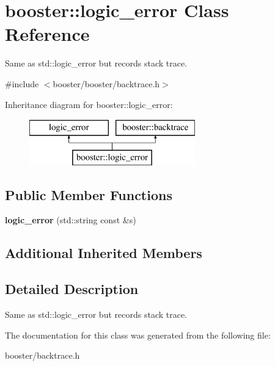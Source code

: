 \section{booster\-:\-:logic\-\_\-error Class Reference}
\label{classbooster_1_1logic__error}


Same as std\-::logic\-\_\-error but records stack trace.  




{\ttfamily \#include $<$booster/booster/backtrace.\-h$>$}

Inheritance diagram for booster\-:\-:logic\-\_\-error\-:\begin{figure}[H]
\begin{center}
\leavevmode
\includegraphics[height=2.000000cm]{classbooster_1_1logic__error}
\end{center}
\end{figure}
\subsection*{Public Member Functions}
\begin{DoxyCompactItemize}
\item 
{\bfseries logic\-\_\-error} (std\-::string const \&s)\label{classbooster_1_1logic__error_a278715b977332a5dfd2130167761518f}

\end{DoxyCompactItemize}
\subsection*{Additional Inherited Members}


\subsection{Detailed Description}
Same as std\-::logic\-\_\-error but records stack trace. 

The documentation for this class was generated from the following file\-:\begin{DoxyCompactItemize}
\item 
booster/backtrace.\-h\end{DoxyCompactItemize}
